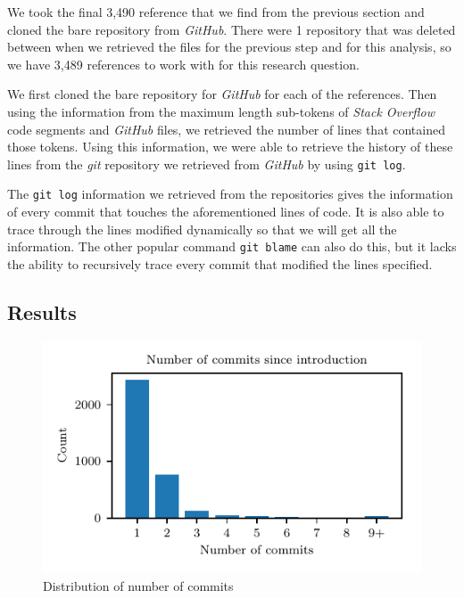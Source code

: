 \documentclass[sigconf]{acmart}
\begin{document}
We took the final 3,490 reference that we find from the previous section and cloned the bare repository from \textit{GitHub}. There were 1 repository that was deleted between when we retrieved the files for the previous step and for this analysis, so we have 3,489 references to work with for this research question.

We first cloned the bare repository for \textit{GitHub} for each of the references. Then using the information from the maximum length sub-tokens of \textit{Stack Overflow} code segments and \textit{GitHub} files, we retrieved the number of lines that contained those tokens. Using this information, we were able to retrieve the history of these lines from the \textit{git} repository we retrieved from \textit{GitHub} by using \texttt{git log}.

The \texttt{git log} information we retrieved from the repositories gives the information of every commit that touches the aforementioned lines of code. It is also able to trace through the lines modified dynamically so that we will get all the information. The other popular command \texttt{git blame} can also do this, but it lacks the ability to recursively trace every commit that modified the lines specified.

\subsection{Results}

\begin{figure}[h]
\centering
\includegraphics[width=\linewidth]{Figure_3.pdf}
\caption{Distribution of number of commits}
\label{fig:dis_commits}
\end{figure}
\end{document}
